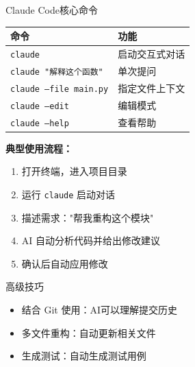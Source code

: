\begin{frame}{Claude Code核心命令}
	\begin{center}
		\begin{tabular}{ll}
			\toprule
			\textbf{命令} & \textbf{功能} \\
			\midrule
			\texttt{claude} & 启动交互式对话 \\
			\texttt{claude "解释这个函数"} & 单次提问 \\
			\texttt{claude --file main.py} & 指定文件上下文 \\
			\texttt{claude --edit} & 编辑模式 \\
			\texttt{claude --help} & 查看帮助 \\
			\bottomrule
		\end{tabular}
	\end{center}

	\vspace{0.5cm}

	\textbf{典型使用流程：}
	\begin{enumerate}
		\item 打开终端，进入项目目录
		\item 运行 \texttt{claude} 启动对话
		\item 描述需求："帮我重构这个模块"
		\item AI 自动分析代码并给出修改建议
		\item 确认后自动应用修改
	\end{enumerate}

	\vspace{0.3cm}

	\begin{block}{高级技巧}
		\begin{itemize}
			\item 结合 Git 使用：AI可以理解提交历史
			\item 多文件重构：自动更新相关文件
			\item 生成测试：自动生成测试用例
		\end{itemize}
	\end{block}
\end{frame}

